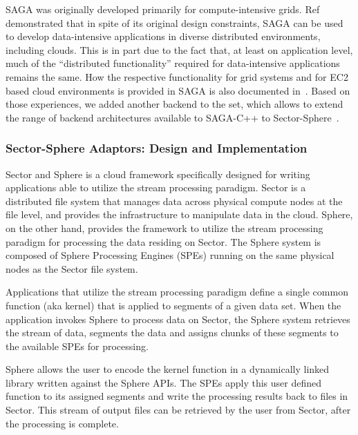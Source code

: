 \documentclass[3p,twocolumn]{elsarticle}
\begin{document}
SAGA was originally developed primarily for compute-intensive grids.
Ref~\cite{saga_ccgrid09} demonstrated that in spite of its original
design constraints, SAGA can be used to develop data-intensive
applications in diverse distributed environments, including clouds.
This is in part due to the fact that, at least on application level,
much of the ``distributed functionality'' required for data-intensive
applications remains the same.  How the respective functionality for
grid systems and for EC2 based cloud environments is provided in SAGA
is also documented in~\cite{saga_ccgrid09}.  Based on those
experiences, we added another backend to the set, which allows to
extend the range of backend architectures available to SAGA-C++ to
Sector-Sphere~\cite{sectorsphere09}.


\subsubsection{Sector-Sphere Adaptors: Design and Implementation}

Sector and Sphere is a cloud framework specifically designed for
writing applications able to utilize the stream processing paradigm.
Sector is a distributed file system that manages data across physical
compute nodes at the file level, and provides the infrastructure to
manipulate data in the cloud.  Sphere, on the other hand, provides the
framework to utilize the stream processing paradigm for processing the
data residing on Sector.  The Sphere system is composed of Sphere
Processing Engines (SPEs) running on the same physical nodes as the
Sector file system.

Applications that utilize the stream processing paradigm define a
single common function (aka kernel) that is applied to segments of a
given data set.  When the application invokes Sphere to process data
on Sector, the Sphere system retrieves the stream of data, segments
the data and assigns chunks of these segments to the available SPEs
for processing.

Sphere allows the user to encode the kernel function in a dynamically
linked library written against the Sphere APIs.  The SPEs apply this
user defined function to its assigned segments and write the
processing results back to files in Sector.  This stream of output
files can be retrieved by the user from Sector, after the processing
is complete. 

\end{document}
